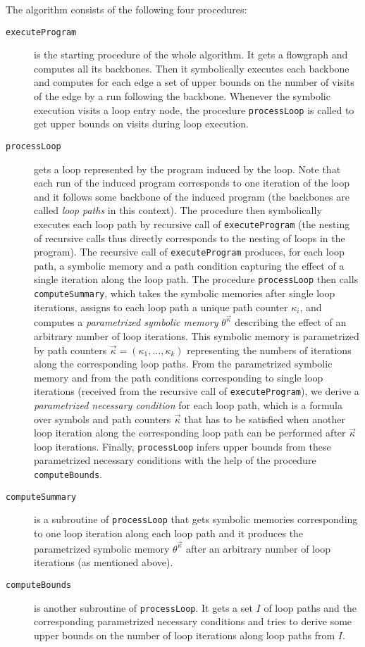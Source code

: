 \documentclass[10pt,a4paper]{article}
\begin{document}
The algorithm consists of the following four procedures:
\begin{description}
\item[\texttt{executeProgram}] is the starting procedure of the whole
  algorithm. It gets a flowgraph and computes all its backbones. Then it
  symbolically executes each backbone and computes for each edge a set of
  upper bounds on the number of visits of the edge by a run following the
  backbone. Whenever the symbolic execution visits a loop entry node, the
  procedure \texttt{processLoop} is called to get upper bounds on visits
  during loop execution.
\item[\texttt{processLoop}] gets a loop represented by the program induced
  by the loop. Note that each run of the induced program corresponds to one
  iteration of the loop and it follows some backbone of the induced program
  (the backbones are called \emph{loop paths} in this context). The
  procedure then symbolically executes each loop path by recursive call of
  \texttt{executeProgram} (the nesting of recursive calls thus directly
  corresponds to the nesting of loops in the program). The recursive call of
  \texttt{executeProgram} produces, for each loop path, a symbolic memory
  and a path condition capturing the effect of a single iteration along the
  loop path. The procedure \texttt{processLoop} then calls
  \texttt{computeSummary}, which takes the symbolic memories after single
  loop iterations, assigns to each loop path a unique path counter
  $\kappa_i$, and computes a \emph{parametrized symbolic memory}
  $\theta^{\vec{\kappa}}$ describing the effect of an arbitrary number of
  loop iterations. This symbolic memory is parametrized by path counters
  $\vec{\kappa}=(\kappa_1,\ldots,\kappa_k)$ representing the numbers of
  iterations along the corresponding loop paths. From the parametrized
  symbolic memory and from the path conditions corresponding to single loop
  iterations (received from the recursive call of \texttt{executeProgram}),
  we derive a \emph{parametrized necessary condition} for each loop path,
  which is a formula over symbols and path counters $\vec{\kappa}$ that has
  to be satisfied when another loop iteration along the corresponding loop
  path can be performed after $\vec{\kappa}$ loop iterations. Finally,
  \texttt{processLoop} infers upper bounds from these parametrized necessary
  conditions with the help of the procedure \texttt{computeBounds}.
\item[\texttt{computeSummary}] is a subroutine of \texttt{processLoop} that
  gets symbolic memories corresponding to one loop iteration along each loop
  path and it produces the parametrized symbolic memory
  $\theta^{\vec{\kappa}}$ after an arbitrary number of loop iterations (as
  mentioned above).
\item[\texttt{computeBounds}] is another subroutine of
  \texttt{processLoop}. It gets a set $I$ of loop paths and the corresponding
  parame\-tri\-zed necessary conditions and tries to derive some upper bounds on
  the number of loop iterations along loop paths from $I$.
\end{description}
\end{document}
